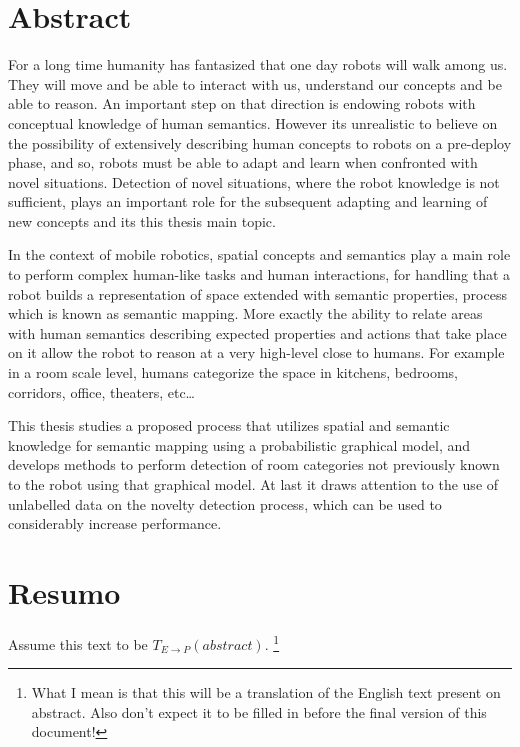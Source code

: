 \chapter*{Abstract}
For a long time humanity has fantasized that one day robots will walk among us.
They will move and be able to interact with us, understand our concepts and
be able to reason.
An important step on that direction is endowing robots with conceptual knowledge
of human semantics. However its unrealistic to believe on the possibility of extensively
describing human concepts to robots on a pre-deploy phase, and so, robots must be able to adapt
and learn when confronted with novel situations.
Detection of novel situations, where the robot knowledge is not sufficient, plays an important
role for the subsequent adapting and learning of new concepts and its this thesis main topic.

In the context of mobile robotics, spatial concepts and semantics play a main role to perform
complex human-like tasks and human interactions, for handling that a robot builds a representation
of space extended with semantic properties, process which is known as semantic mapping.
More exactly the ability to relate areas with human semantics describing expected properties
and actions that take place on it allow the robot to reason at a very high-level close to humans.
For example in a room scale level, humans categorize the space in kitchens, bedrooms, corridors,
office, theaters, etc\dots

This thesis studies a proposed %
process that utilizes spatial and semantic knowledge for semantic mapping using a
probabilistic graphical model,
and develops methods to perform detection of room categories not previously
known to the robot using that graphical model.
At last it draws attention to the use of unlabelled data on the novelty detection process,
which can be used to considerably increase performance.


\chapter*{Resumo}
Assume this text to be $T_{E \rightarrow P}(abstract)$.
\footnote{What I mean is that this will be a translation of the English text
present on abstract. Also don't expect it to be filled in before the final
version of this document!}

